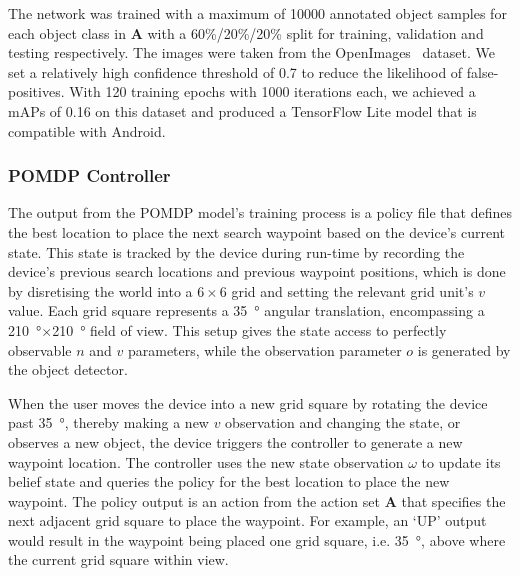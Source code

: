 \documentclass[runningheads]{llncs}
\newcommand\todo[1]{\textcolor{red}{#1}}
\begin{document}
The network was trained with a maximum of 10000 annotated object samples for each object class in $\mathbf{A}$ with a 60\%/20\%/20\% split for training, validation and testing respectively.
The images were taken from the OpenImages~\cite{openimages} dataset.
We set a relatively high confidence threshold of 0.7 to reduce the likelihood of false-positives.
With 120 training epochs with 1000 iterations each, we achieved a mAPs of 0.16 on this dataset and produced a TensorFlow Lite model that is compatible with Android. 

\subsubsection{POMDP Controller}

The output from the POMDP model's training process is a policy file that defines the best location to place the next search waypoint based on the device's current state.
This state is tracked by the device during run-time by recording the device's previous search locations and previous waypoint positions, which is done by disretising the world into a $6\times6$ grid and setting the relevant grid unit's $v$ value.
Each grid square represents a \SI{35}{\degree} angular translation, encompassing a \SI{210}{\degree}$\times$\SI{210}{\degree} field of view. 
This setup gives the state access to perfectly observable $n$ and $v$ parameters, while the observation parameter $o$ is generated by the object detector. 

When the user moves the device into a new grid square by rotating the device past \SI{35}{\degree}, thereby making a new $v$ observation and changing the state, or observes a new object, the device triggers the controller to generate a new waypoint location.
The controller uses the new state observation $\omega$ to update its belief state and queries the policy for the best location to place the new waypoint. 
The policy output is an action from the action set $\mathbf{A}$ that specifies the next adjacent grid square to place the waypoint.
For example, an `UP' output would result in the waypoint being placed one grid square, i.e. \SI{35}{\degree}, above where the current grid square within view. 
\end{document}
